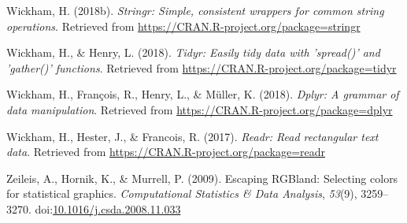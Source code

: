 \documentclass[man]{apa6}
\theoremstyle{definition}
\theoremstyle{definition}
\theoremstyle{definition}
\theoremstyle{remark}
\begin{document}
\hypertarget{ref-R-stringr}{}
Wickham, H. (2018b). \emph{Stringr: Simple, consistent wrappers for
common string operations}. Retrieved from
\url{https://CRAN.R-project.org/package=stringr}

\hypertarget{ref-R-tidyr}{}
Wickham, H., \& Henry, L. (2018). \emph{Tidyr: Easily tidy data with
'spread()' and 'gather()' functions}. Retrieved from
\url{https://CRAN.R-project.org/package=tidyr}

\hypertarget{ref-R-dplyr}{}
Wickham, H., François, R., Henry, L., \& Müller, K. (2018). \emph{Dplyr:
A grammar of data manipulation}. Retrieved from
\url{https://CRAN.R-project.org/package=dplyr}

\hypertarget{ref-R-readr}{}
Wickham, H., Hester, J., \& Francois, R. (2017). \emph{Readr: Read
rectangular text data}. Retrieved from
\url{https://CRAN.R-project.org/package=readr}

\hypertarget{ref-R-colorspace_a}{}
Zeileis, A., Hornik, K., \& Murrell, P. (2009). Escaping RGBland:
Selecting colors for statistical graphics. \emph{Computational
Statistics \& Data Analysis}, \emph{53}(9), 3259--3270.
doi:\href{https://doi.org/10.1016/j.csda.2008.11.033}{10.1016/j.csda.2008.11.033}

\endgroup
\end{document}
